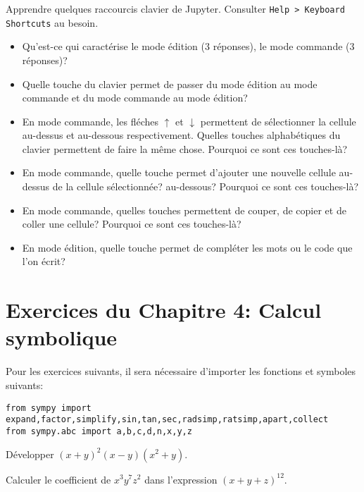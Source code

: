 
\begin{exercice}
Apprendre quelques raccourcis clavier de Jupyter.
Consulter \texttt{Help > Keyboard Shortcuts} au besoin.
\begin{itemize}
\item Qu'est-ce qui caractérise le mode édition (3 réponses), le mode commande
(3 réponses)?
\item Quelle touche du clavier permet de passer du mode édition au mode commande
et du mode commande au mode édition?
\item En mode commande, les fléches $\uparrow$ et $\downarrow$ permettent de
sélectionner la cellule au-dessus et au-dessous respectivement. Quelles touches
alphabétiques du clavier permettent de faire la même chose. Pourquoi ce sont ces
touches-là?
\item En mode commande, quelle touche permet d'ajouter une nouvelle cellule
au-dessus de la cellule sélectionnée? au-dessous? Pourquoi ce sont ces touches-là?
\item En mode commande, quelles touches permettent de couper, de copier et de
coller une cellule? Pourquoi ce sont ces touches-là?
\item En mode édition, quelle touche permet de compléter les mots ou le code que
l'on écrit?
\end{itemize}
\end{exercice}

\section*{Exercices du Chapitre 4: Calcul symbolique}


Pour les exercices suivants, il sera nécessaire d'importer les fonctions
et symboles suivants:
\begin{verbatim}
from sympy import expand,factor,simplify,sin,tan,sec,radsimp,ratsimp,apart,collect
from sympy.abc import a,b,c,d,n,x,y,z
\end{verbatim}

\begin{exercice}
Développer $(x+y)^2(x-y)(x^2+y)$.
\end{exercice}

\begin{exercice}
    Calculer le coefficient de $x^3y^7z^2$ dans l'expression $(x+y+z)^{12}$.
\end{exercice}


